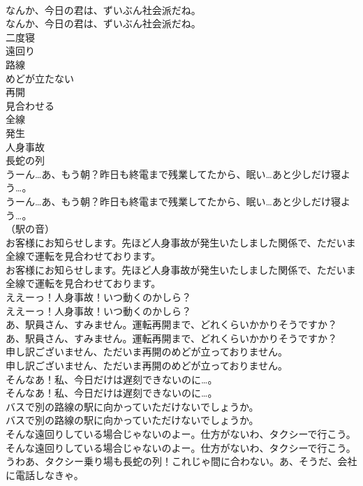 \documentclass[8pt]{extreport}
\begin{document}
\begin{CJK}{UTF8}{min}
\\	なんか、今日の君は、ずいぶん社会派だね。	
\\	なんか、今日の君は、ずいぶん社会派だね。 
\\	二度寝
\\	遠回り
\\	路線
\\	めどが立たない
\\	再開
\\	見合わせる
\\	全線
\\	発生
\\	人身事故
\\	長蛇の列
\\	うーん…あ、もう朝？昨日も終電まで残業してたから、眠い…あと少しだけ寝よう…。	
\\	うーん…あ、もう朝？昨日も終電まで残業してたから、眠い…あと少しだけ寝よう…。 
\\	（駅の音）	
\\	お客様にお知らせします。先ほど人身事故が発生いたしました関係で、ただいま全線で運転を見合わせております。	
\\	お客様にお知らせします。先ほど人身事故が発生いたしました関係で、ただいま全線で運転を見合わせております。 
\\	ええーっ！人身事故！いつ動くのかしら？	
\\	ええーっ！人身事故！いつ動くのかしら？ 
\\	あ、駅員さん、すみません。運転再開まで、どれくらいかかりそうですか？	
\\	あ、駅員さん、すみません。運転再開まで、どれくらいかかりそうですか？ 
\\	申し訳ございません、ただいま再開のめどが立っておりません。	
\\	申し訳ございません、ただいま再開のめどが立っておりません。 
\\	そんなあ！私、今日だけは遅刻できないのに…。	
\\	そんなあ！私、今日だけは遅刻できないのに…。 
\\	バスで別の路線の駅に向かっていただけないでしょうか。	
\\	バスで別の路線の駅に向かっていただけないでしょうか。 
\\	そんな遠回りしている場合じゃないのよー。仕方がないわ、タクシーで行こう。	
\\	そんな遠回りしている場合じゃないのよー。仕方がないわ、タクシーで行こう。 
\\	うわあ、タクシー乗り場も長蛇の列！これじゃ間に合わない。あ、そうだ、会社に電話しなきゃ。	

\end{CJK}
\end{document}
